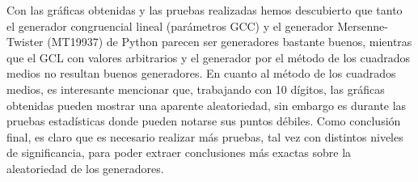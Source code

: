 Con las gráficas obtenidas y las pruebas realizadas hemos descubierto que tanto el generador congruencial lineal (parámetros GCC) y el generador Mersenne-Twister (MT19937) de Python parecen ser generadores bastante buenos, mientras que el GCL con valores arbitrarios y el generador por el método de los cuadrados medios no resultan buenos generadores. En cuanto al método de los cuadrados medios, es interesante mencionar que, trabajando con 10 dígitos, las gráficas obtenidas pueden mostrar una aparente aleatoriedad, sin embargo es durante las pruebas estadísticas donde pueden notarse sus puntos débiles. Como conclusión final, es claro que es necesario realizar más pruebas, tal vez con distintos niveles de significancia, para poder extraer conclusiones más exactas sobre la aleatoriedad de los generadores.